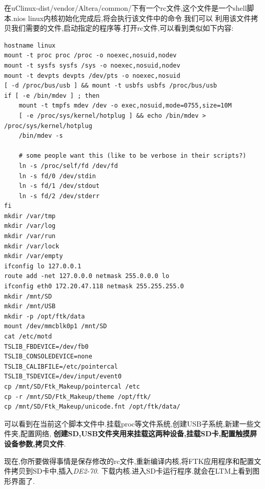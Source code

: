 \documentclass[12pt,a4paper,titlepage]{article}
\begin{document}
在uClinux-dist/vendor/Altera/common/下有一个rc文件,这个文件是一个shell脚本.nios linux内核初始化完成后,将会执行该文件中的命令.我们可以
利用该文件拷贝我们需要的文件,启动指定的程序等.打开rc文件,可以看到类似如下内容:
\begin{verbatim}
hostname linux
mount -t proc proc /proc -o noexec,nosuid,nodev
mount -t sysfs sysfs /sys -o noexec,nosuid,nodev
mount -t devpts devpts /dev/pts -o noexec,nosuid
[ -d /proc/bus/usb ] && mount -t usbfs usbfs /proc/bus/usb
if [ -e /bin/mdev ] ; then
	mount -t tmpfs mdev /dev -o exec,nosuid,mode=0755,size=10M
	[ -e /proc/sys/kernel/hotplug ] && echo /bin/mdev > /proc/sys/kernel/hotplug
	/bin/mdev -s

	# some people want this (like to be verbose in their scripts?)
	ln -s /proc/self/fd /dev/fd
	ln -s fd/0 /dev/stdin
	ln -s fd/1 /dev/stdout
	ln -s fd/2 /dev/stderr
fi
mkdir /var/tmp
mkdir /var/log
mkdir /var/run
mkdir /var/lock
mkdir /var/empty
ifconfig lo 127.0.0.1
route add -net 127.0.0.0 netmask 255.0.0.0 lo
ifconfig eth0 172.20.47.118 netmask 255.255.255.0
mkdir /mnt/SD
mkdir /mnt/USB
mkdir -p /opt/ftk/data
mount /dev/mmcblk0p1 /mnt/SD
cat /etc/motd
TSLIB_FBDEVICE=/dev/fb0
TSLIB_CONSOLEDEVICE=none
TSLIB_CALIBFILE=/etc/pointercal
TSLIB_TSDEVICE=/dev/input/event0
cp /mnt/SD/Ftk_Makeup/pointercal /etc
cp -r /mnt/SD/Ftk_Makeup/theme /opt/ftk/
cp /mnt/SD/Ftk_Makeup/unicode.fnt /opt/ftk/data/
\end{verbatim}
可以看到在当前这个脚本文件中.挂载proc等文件系统,创建USB子系统,新建一些文件夹,配置网络,
\textbf{创建SD,USB文件夹用来挂载这两种设备,挂载SD卡,配置触摸屏设备参数,拷贝文件}.

现在,你所要做得事情是保存修改的rc文件,重新编译内核,将FTK应用程序和配置文件拷贝到SD卡中,插入\textit{DE2-70}.
下载内核.进入SD卡运行程序.就会在LTM上看到图形界面了.
\end{document}
